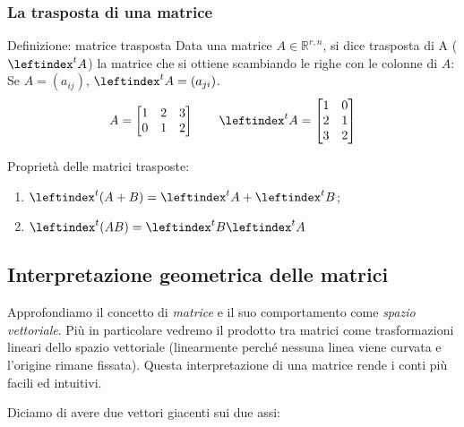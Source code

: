 \documentclass[x11names]{article}
\begin{document}
\subsubsection{La trasposta di una matrice}
\begin{center}
\colorbox{myblue}{\begin{minipage}{5.75in}
\begin{blues}{Definizione: matrice trasposta}
    Data una matrice $A \in \mathbb{R}^{r,n}$, si dice trasposta di A ($\leftindex^t{A}$) la matrice che si ottiene scambiando le righe con le colonne di $A$: Se $A = (a_{ij})$, $\leftindex^t{A} = (a_{ji})$.
$$
    A = \begin{bmatrix}
        1 & 2 & 3 \\
        0 & 1 & 2 
    \end{bmatrix}
    \qquad
    \leftindex^t{A} = \begin{bmatrix}
        1 & 0 \\
        2 & 1 \\
        3 & 2
    \end{bmatrix}
$$

\end{blues}
\end{minipage}}        
\end{center}

Proprietà delle matrici trasposte:
\begin{enumerate}
\item $\leftindex^t{\left(A+B\right)} = \leftindex^t{A} + \leftindex^t{B}$;
\item $\leftindex^t{(AB)} = \leftindex^t{B} \leftindex^t{A}$
\end{enumerate}

\subsection*{Interpretazione geometrica delle matrici}
Approfondiamo il concetto di \textit{matrice} e il suo comportamento come \textit{spazio vettoriale}. Più in particolare vedremo il prodotto tra matrici come trasformazioni lineari dello spazio vettoriale (linearmente perché nessuna linea viene curvata e l'origine rimane fissata). Questa interpretazione di una matrice rende i conti più facili ed intuitivi. 

\noindent
Diciamo di avere due vettori giacenti sui due assi:

\begin{center}

\end{center}
\end{document}
